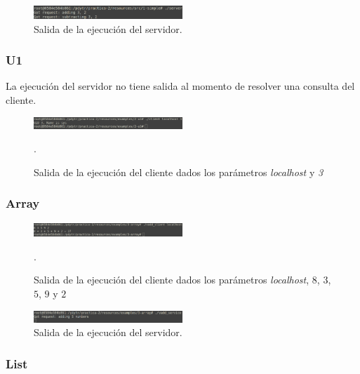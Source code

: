 \documentclass[osajnl,twocolumn,showpacs,superscriptaddress,10pt]{revtex4-1} %
\begin{document}
\begin{figure}[H]
    \centering
    \includegraphics[width=0.5\textwidth]{capturas/1-simple-server}
    \caption{Salida de la ejecución del servidor.}
    \label{figure:1-simple-server}
\end{figure}

\subsubsection{U1}

La ejecución del servidor no tiene salida al momento de resolver una consulta del cliente.

\begin{figure}[H]
    \centering
    \includegraphics[width=0.5\textwidth]{capturas/2-u1-client}
    \caption{Salida de la ejecución del cliente dados los parámetros \textit{localhost} y \textit{3}}.
    \label{figure:2-u1-client}
\end{figure}

\subsubsection{Array}

\begin{figure}[H]
    \centering
    \includegraphics[width=0.5\textwidth]{capturas/3-array-client}
    \caption{Salida de la ejecución del cliente dados los parámetros \textit{localhost}, $8$, $3$, $5$, $9$ y $2$}.
    \label{figure:3-array-client}
\end{figure}

\begin{figure}[H]
    \centering
    \includegraphics[width=0.5\textwidth]{capturas/3-array-server}
    \caption{Salida de la ejecución del servidor.}
    \label{figure:3-array-server}
\end{figure}

\subsubsection{List}
\end{document}
